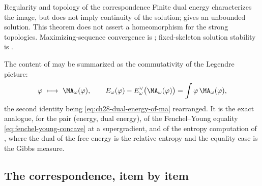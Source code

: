 \begin{warning}{Regularity and topology of the correspondence}
Finite dual energy characterizes the image, but does not imply continuity
of the solution;  gives an unbounded
solution.  This theorem does not assert a homeomorphism for the strong
topologies.  Maximizing-sequence convergence is
; fixed-skeleton solution stability
is .
\end{warning}

\begin{remark}
\label{rem:ch28-correspondence-line}
The content of  may be summarized as the
commutativity of the Legendre picture:
\[
 \varphi\ \longmapsto\ \MA_\omega(\varphi),
 \qquad
 E_\omega(\varphi)-E^\vee_\omega\bigl(\MA_\omega(\varphi)\bigr)
 =\int\varphi\,\MA_\omega(\varphi),
\]
the second identity being \eqref{eq:ch28-dual-energy-of-ma} rearranged.  It
is the exact analogue, for the pair (energy, dual energy), of the
Fenchel--Young equality \eqref{eq:fenchel-young-concave} at a supergradient,
and of the entropy computation of , where the
dual of the free energy is the relative entropy and the equality case is the
Gibbs measure.
\end{remark}

\subsection{The correspondence, item by item}
\label{sec:ch28-cy-table}

